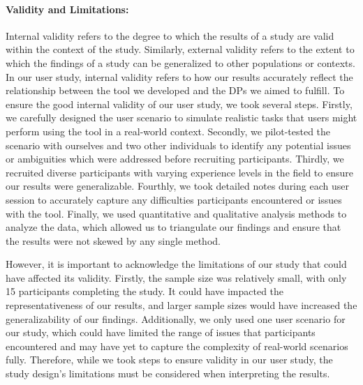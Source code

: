 \paragraph{Validity and Limitations:}
Internal validity refers to the degree to which the results of a study are valid within the context of the study. 
Similarly, external validity refers to the extent to which the findings of a study can be generalized to other populations or contexts.
In our user study, internal validity refers to how our results accurately reflect the relationship between the tool we developed and the DPs we aimed to fulfill.
To ensure the good internal validity of our user study, we took several steps.
Firstly, we carefully designed the user scenario to simulate realistic tasks that users might perform using the tool in a real-world context. 
Secondly, we pilot-tested the scenario with ourselves and two other individuals to identify any potential issues or ambiguities which were addressed before recruiting participants. 
Thirdly, we recruited diverse participants with varying experience levels in the field to ensure our results were generalizable. 
Fourthly, we took detailed notes during each user session to accurately capture any difficulties participants encountered or issues with the tool. Finally, we used quantitative and qualitative analysis methods to analyze the data, which allowed us to triangulate our findings and ensure that the results were not skewed by any single method.

However, it is important to acknowledge the limitations of our study that could have affected its validity. 
Firstly, the sample size was relatively small, with only 15 participants completing the study. 
It could have impacted the representativeness of our results, and larger sample sizes would have increased the generalizability of our findings. 
Additionally, we only used one user scenario for our study, which could have limited the range of issues that participants encountered and may have yet to capture the complexity of real-world scenarios fully.
Therefore, while we took steps to ensure validity in our user study, the study design's limitations must be considered when interpreting the results.